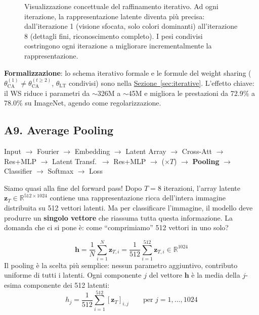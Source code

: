 \documentclass[12pt,a4paper]{article}
\begin{document}
\begin{figure}[H]
\caption{Visualizzazione concettuale del raffinamento iterativo. Ad ogni iterazione, la rappresentazione latente diventa pi\`u precisa: dall'iterazione 1 (visione sfocata, solo colori dominanti) all'iterazione 8 (dettagli fini, riconoscimento completo). I pesi condivisi costringono ogni iterazione a migliorare incrementalmente la rappresentazione.}
\label{fig:iterative_refinement}
\end{figure}

\textbf{Formalizzazione}: lo schema iterativo formale e le formule del weight sharing ($\theta_{\text{CA}}^{(1)} \neq \theta_{\text{CA}}^{(t\geq 2)}$, $\theta_{\text{LT}}$ condivisi) sono nella \hyperref[sec:iterative]{Sezione~\ref*{sec:iterative}}. L'effetto chiave: il WS riduce i parametri da $\sim$326M a $\sim$45M e migliora le prestazioni da 72.9\% a 78.0\% su ImageNet, agendo come regolarizzazione.


\subsection{A9. Average Pooling} \label{sec:pooling}

\begin{pipelinebox}
Input $\to$ Fourier $\to$ Embedding $\to$ Latent Array $\to$ Cross-Att $\to$ Res+MLP $\to$ Latent Transf.\ $\to$ Res+MLP $\to$ ($\times T$) $\to$ \textbf{Pooling} $\to$ Classifier $\to$ Softmax $\to$ Loss
\end{pipelinebox}

Siamo quasi alla fine del forward pass! Dopo $T = 8$ iterazioni, l'array latente $\mathbf{z}_T \in \mathbb{R}^{512 \times 1024}$ contiene una rappresentazione ricca dell'intera immagine distribuita su 512 vettori latenti. Ma per classificare l'immagine, il modello deve produrre un \textbf{singolo vettore} che riassuma tutta questa informazione. La domanda che ci si pone \`e: come ``comprimiamo'' 512 vettori in uno solo?

\begin{formulabox}
\[
    \mathbf{h} = \frac{1}{N} \sum_{i=1}^{N} \mathbf{z}_{T,i} = \frac{1}{512} \sum_{i=1}^{512} \mathbf{z}_{T,i} \in \mathbb{R}^{1024}
\]
Il pooling \`e la scelta pi\`u semplice: nessun parametro aggiuntivo, contributo uniforme di tutti i latenti. Ogni componente $j$ del vettore $\mathbf{h}$ \`e la media della $j$-esima componente dei 512 latenti:
\[
    h_j = \frac{1}{512} \sum_{i=1}^{512} [\mathbf{z}_{T}]_{i,j} \qquad \text{per } j = 1, \ldots, 1024
\]
\end{formulabox}
\end{document}
